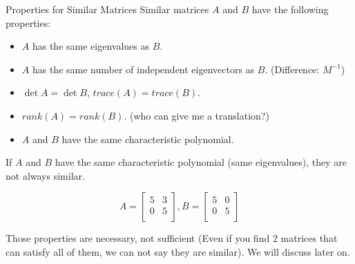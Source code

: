 \documentclass{beamer}
\begin{document}
\begin{frame}{Properties for Similar Matrices}
    Similar matrices $A$ and $B$ have the following properties:
    \begin{itemize}
        \item $A$ has the same eigenvalues as $B$.
        \item $A$ has the same number of independent eigenvectors as $B$. (Difference: $M^{-1}$)
        \item $\det A = \det B$, $trace (A) = trace (B)$.
        \item $rank (A) = rank (B)$. (who can give me a translation?)
        \item $A$ and $B$ have the same characteristic polynomial.
    \end{itemize}

    \vspace{3pt}
    If $A$ and $B$ have the same characteristic polynomial (same eigenvalues), they are not always similar.

    \begin{equation*}
        A=\left[ \begin{matrix}
            5&		3\\
            0&		5\\
        \end{matrix} \right] , B=\left[ \begin{matrix}
            5&		0\\
            0&		5\\
        \end{matrix} \right]
    \end{equation*}


    Those properties are necessary, not sufficient (Even if you find 2 matrices that can satisfy all of them, we can not say they are similar). We will discuss later on.
\end{frame}
\end{document}
